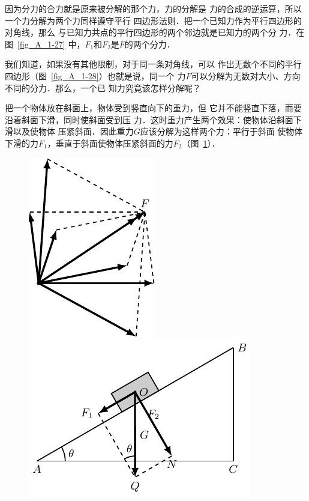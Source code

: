     因为分力的合力就是原来被分解的那个力，力的分解是
力的合成的逆运算，所以一个力分解为两个力同样遵守平行
四边形法则．把一个已知力作为平行四边形的对角线，那么
与已知力共点的平行四边形的两个邻边就是已知力的两个分
力．在图~\ref{fig_A_1-27} 中，$F_1$和$F_2$是$F$的两个分力．


    我们知道，如果没有其他限制，对于同一条对角线，可以
作出无数个不同的平行四边形（图~\ref{fig_A_1-28}）也就是说，同一个
力$F$可以分解为无数对大小、方向不同的分力．那么，一个已
知力究竟该怎样分解呢？

    把一个物体放在斜面上，物体受到竖直向下的重力，但
它并不能竖直下落，而要沿着斜面下滑，同时使斜面受到压
力．这时重力产生两个效果：使物体沿斜面下滑以及使物体
压紧斜面．因此重力$G$应该分解为这样两个力：平行于斜面
使物体下滑的力$F_1$，垂直于斜面使物体压紧斜面的力$F_2$（图~\ref{fig_A_1-29}）．


\begin{figure} [htp]
\centering
\begin{minipage} [t]{0.48\textwidth} 
\centering
\includegraphics{fig/A/1-28.pdf} 
\caption{} \label{fig_A_1-28} 
\end{minipage} 
\begin{minipage} [t]{0.48\textwidth} 
\centering
\includegraphics{fig/A/1-29.pdf} 
\caption{} \label{fig_A_1-29} 
\end{minipage} 
\end{figure} 

